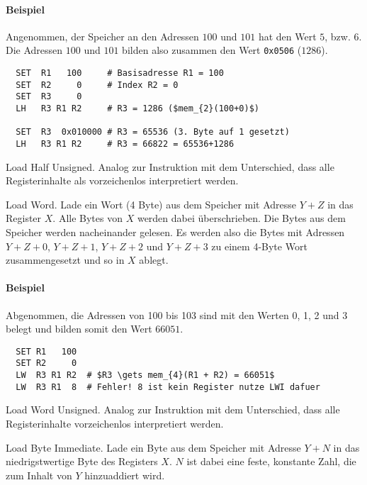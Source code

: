 \paragraph{Beispiel}
Angenommen, der Speicher an den Adressen $100$ und $101$ hat den Wert $5$,
bzw. $6$. Die Adressen $100$ und $101$ bilden also zusammen den Wert
\texttt{0x0506} ($1286$).
\begin{lstlisting}
  SET  R1   100     # Basisadresse R1 = 100
  SET  R2     0     # Index R2 = 0
  SET  R3     0
  LH   R3 R1 R2     # R3 = 1286 ($mem_{2}(100+0)$)

  SET  R3  0x010000 # R3 = 65536 (3. Byte auf 1 gesetzt)
  LH   R3 R1 R2     # R3 = 66822 = 65536+1286
\end{lstlisting}



\glqq Load Half Unsigned\grqq.
Analog zur Instruktion  mit dem Unterschied, dass alle Registerinhalte
als vorzeichenlos interpretiert werden.


\glqq Load Word\grqq.
Lade ein Wort (4 Byte) aus dem Speicher mit Adresse $Y + Z$ in das Register $X$.
Alle Bytes von $X$ werden dabei überschrieben.
Die Bytes aus dem Speicher werden nacheinander gelesen. Es werden also die
Bytes mit Adressen $Y + Z + 0$, $Y + Z + 1$, $Y + Z + 2$ und $Y + Z + 3$ zu
einem 4-Byte Wort zusammengesetzt und so in $X$ ablegt.

\paragraph{Beispiel}
Abgenommen, die Adressen von 100 bis 103 sind mit den Werten 0, 1, 2 und 3
belegt und bilden somit den Wert $66051$.
\begin{lstlisting}
  SET R1   100
  SET R2     0
  LW  R3 R1 R2  # $R3 \gets mem_{4}(R1 + R2) = 66051$
  LW  R3 R1  8  # Fehler! 8 ist kein Register nutze LWI dafuer
\end{lstlisting}


\glqq Load Word Unsigned\grqq.
Analog zur Instruktion  mit dem Unterschied, dass alle Registerinhalte
vorzeichenlos interpretiert werden.




\glqq Load Byte Immediate\grqq.
Lade ein Byte aus dem Speicher mit Adresse $Y + N$ in das niedrigstwertige Byte
des Registers $X$. $N$ ist dabei eine feste, konstante Zahl, die zum Inhalt von
$Y$ hinzuaddiert wird.

